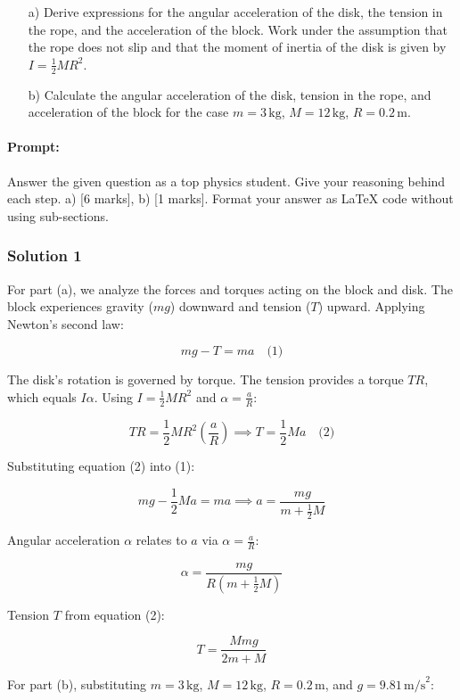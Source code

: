 \documentclass{article}
\begin{document}
\begin{itemize}
    \item[a)] Derive expressions for the angular acceleration of the disk, the tension in the rope, and the acceleration of the block. Work under the assumption that the rope does not slip and that the moment of inertia of the disk is given by $I = \frac{1}{2} M R^2$.
    
    \item[b)] Calculate the angular acceleration of the disk, tension in the rope, and acceleration of the block for the case $m = 3\, \text{kg}$, $M = 12\, \text{kg}$, $R = 0.2\, \text{m}$.
\end{itemize}


\paragraph{Prompt: \\} 
Answer the given question as a top physics student. Give your reasoning behind each step. a) [6 marks], b) [1 marks].
Format your answer as LaTeX code without using sub-sections.


\subsubsection{Solution 1}
For part (a), we analyze the forces and torques acting on the block and disk. The block experiences gravity ($mg$) downward and tension ($T$) upward. Applying Newton's second law:

\[
mg - T = ma \quad \text{(1)}
\]

The disk's rotation is governed by torque. The tension provides a torque $TR$, which equals $I\alpha$. Using $I = \frac{1}{2}MR^2$ and $\alpha = \frac{a}{R}$:

\[
TR = \frac{1}{2}MR^2 \left(\frac{a}{R}\right) \implies T = \frac{1}{2}Ma \quad \text{(2)}
\]

Substituting equation (2) into (1):

\[
mg - \frac{1}{2}Ma = ma \implies a = \frac{mg}{m + \frac{1}{2}M}
\]

Angular acceleration $\alpha$ relates to $a$ via $\alpha = \frac{a}{R}$:

\[
\alpha = \frac{mg}{R\left(m + \frac{1}{2}M\right)}
\]

Tension $T$ from equation (2):

\[
T = \frac{Mmg}{2m + M}
\]

For part (b), substituting $m = 3\,\text{kg}$, $M = 12\,\text{kg}$, $R = 0.2\,\text{m}$, and $g = 9.81\,\text{m/s}^2$:
\end{document}
